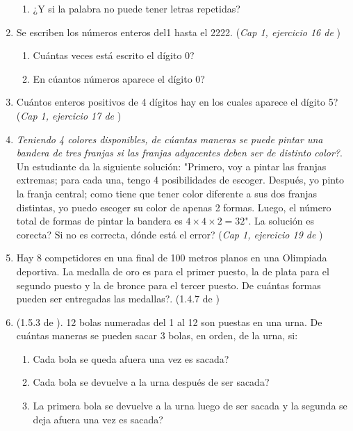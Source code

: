 \begin{enumerate}
\begin{enumerate}
		\item ¿Y si la palabra no puede tener letras repetidas?
	\end{enumerate}
	\item Se escriben los números enteros del1 hasta el 2222. (\textit{Cap 1, ejercicio 16 de }\cite{Contagem_e_probabilidade})
	\begin{enumerate}
		\item Cuántas veces está escrito el dígito 0?
		\item En cúantos números aparece el dígito 0? 
	\end{enumerate}
	\item Cuántos enteros positivos de 4 dígitos hay en los cuales aparece el dígito 5? (\textit{Cap 1, ejercicio 17 de }\cite{Contagem_e_probabilidade})
	\item \textit{Teniendo 4 colores disponibles, de cúantas maneras se puede pintar una bandera de tres franjas si las franjas adyacentes deben ser de distinto color?}. Un estudiante da la siguiente solución: "Primero, voy a pintar las franjas extremas; para cada una, tengo 4 posibilidades de escoger. Después, yo pinto la franja central; como tiene que tener color diferente a sus dos franjas distintas, yo puedo escoger su color de apenas 2 formas. Luego, el número total de formas de pintar la bandera es $4\times 4\times 2=32$". La solución es corecta? Si no es correcta, dónde está el error? (\textit{Cap 1, ejercicio 19 de }\cite{Contagem_e_probabilidade}) 
	
	\item Hay 8 competidores en una final de 100 metros planos en una Olimpiada deportiva. La medalla de oro es para el primer puesto, la de plata para el segundo puesto y la de bronce para el tercer puesto. De cuántas formas pueden ser entregadas las medallas?. (1.4.7 de  \cite{ICP_Aops}) 
	
	\item (1.5.3 de  \cite{ICP_Aops}). 12 bolas numeradas del 1 al 12 son puestas en una urna. De cuántas maneras se pueden sacar 3 bolas, en orden, de la urna, si:
	\begin{enumerate}
		\item Cada bola se queda afuera una vez es sacada?
		\item Cada bola se devuelve a la urna después de ser sacada?
		\item La primera bola se devuelve a la urna  luego de ser sacada y la segunda se deja afuera una vez es sacada?
	\end{enumerate}
	

\end{enumerate}
